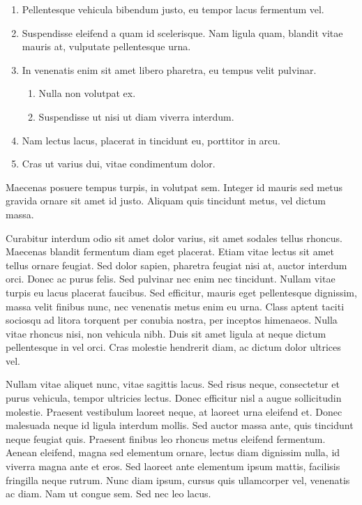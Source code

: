\begin{enumerate}
\item Pellentesque vehicula bibendum justo, eu tempor lacus fermentum vel.
\item Suspendisse eleifend a quam id scelerisque. Nam ligula quam, blandit vitae mauris at, vulputate pellentesque urna.
\item In venenatis enim sit amet libero pharetra, eu tempus velit pulvinar.
\begin{enumerate}
\item Nulla non volutpat ex.
\item Suspendisse ut nisi ut diam viverra interdum.
\end{enumerate}
\item Nam lectus lacus, placerat in tincidunt eu, porttitor in arcu.
\item Cras ut varius dui, vitae condimentum dolor.
\end{enumerate}

Maecenas posuere tempus turpis, in volutpat sem.
Integer id mauris sed metus gravida ornare sit amet id justo.
Aliquam quis tincidunt metus, vel dictum massa.

Curabitur interdum odio sit amet dolor varius, sit amet sodales tellus rhoncus.
Maecenas blandit fermentum diam eget placerat.
Etiam vitae lectus sit amet tellus ornare feugiat.
Sed dolor sapien, pharetra feugiat nisi at, auctor interdum orci.
Donec ac purus felis.
Sed pulvinar nec enim nec tincidunt.
Nullam vitae turpis eu lacus placerat faucibus.
Sed efficitur, mauris eget pellentesque dignissim, massa velit finibus nunc, nec venenatis metus enim eu urna.
Class aptent taciti sociosqu ad litora torquent per conubia nostra, per inceptos himenaeos.
Nulla vitae rhoncus nisi, non vehicula nibh.
Duis sit amet ligula at neque dictum pellentesque in vel orci.
Cras molestie hendrerit diam, ac dictum dolor ultrices vel.

Nullam vitae aliquet nunc, vitae sagittis lacus.
Sed risus neque, consectetur et purus vehicula, tempor ultricies lectus.
Donec efficitur nisl a augue sollicitudin molestie.
Praesent vestibulum laoreet neque, at laoreet urna eleifend et.
Donec malesuada neque id ligula interdum mollis.
Sed auctor massa ante, quis tincidunt neque feugiat quis.
Praesent finibus leo rhoncus metus eleifend fermentum.
Aenean eleifend, magna sed elementum ornare, lectus diam dignissim nulla, id viverra magna ante et eros.
Sed laoreet ante elementum ipsum mattis, facilisis fringilla neque rutrum.
Nunc diam ipsum, cursus quis ullamcorper vel, venenatis ac diam.
Nam ut congue sem.
Sed nec leo lacus.

